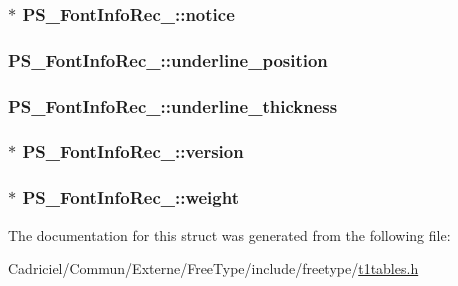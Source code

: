 \hypertarget{struct_p_s___font_info_rec___a63858ebce653f21d9aa2ddc61ee32b80}{
\subsubsection[{notice}]{$\ast$ P\-S\-\_\-\-Font\-Info\-Rec\-\_\-\-::notice}}\label{struct_p_s___font_info_rec___a63858ebce653f21d9aa2ddc61ee32b80}
\hypertarget{struct_p_s___font_info_rec___a772af52d17288d7846e8893e74d55212}{
\subsubsection[{underline\-\_\-position}]{ P\-S\-\_\-\-Font\-Info\-Rec\-\_\-\-::underline\-\_\-position}}\label{struct_p_s___font_info_rec___a772af52d17288d7846e8893e74d55212}
\hypertarget{struct_p_s___font_info_rec___a423904e811db5195485557bf0dccf126}{
\subsubsection[{underline\-\_\-thickness}]{ P\-S\-\_\-\-Font\-Info\-Rec\-\_\-\-::underline\-\_\-thickness}}\label{struct_p_s___font_info_rec___a423904e811db5195485557bf0dccf126}
\hypertarget{struct_p_s___font_info_rec___adb595076e50f8e7ece9446f612433cfc}{
\subsubsection[{version}]{$\ast$ P\-S\-\_\-\-Font\-Info\-Rec\-\_\-\-::version}}\label{struct_p_s___font_info_rec___adb595076e50f8e7ece9446f612433cfc}
\hypertarget{struct_p_s___font_info_rec___a057243ec7cf62f573fa675ccb728f4b1}{
\subsubsection[{weight}]{$\ast$ P\-S\-\_\-\-Font\-Info\-Rec\-\_\-\-::weight}}\label{struct_p_s___font_info_rec___a057243ec7cf62f573fa675ccb728f4b1}


The documentation for this struct was generated from the following file\-:\begin{DoxyCompactItemize}
\item 
Cadriciel/\-Commun/\-Externe/\-Free\-Type/include/freetype/\hyperlink{t1tables_8h}{t1tables.\-h}\end{DoxyCompactItemize}
